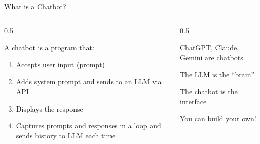 \documentclass[aspectratio=169]{beamer}
\begin{document}
\begin{frame}{What is a Chatbot?}
\begin{columns}[T]
\begin{column}{0.5\textwidth}
\begin{shadedbox}[title=\textbf{Simple Definition}]
A chatbot is a program that:
\begin{enumerate}\small
  \item Accepts user input (prompt)
  \item Adds system prompt and sends to an LLM via API
  \item Displays the response
  \item Captures prompts and responses in a loop and sends history to LLM each time
\end{enumerate}
\end{shadedbox}
\end{column}
\begin{column}{0.5\textwidth}
\begin{baritemize}\small
  \item ChatGPT, Claude, Gemini are chatbots
  \item The LLM is the ``brain''
  \item The chatbot is the interface
  \item You can build your own!
\end{baritemize}
\end{column}
\end{columns}
\end{frame}
\end{document}
